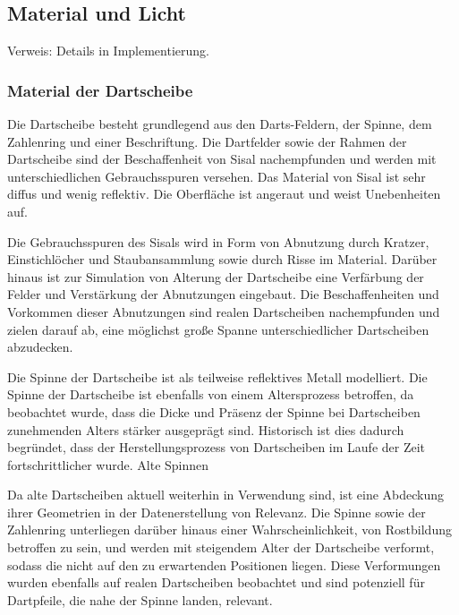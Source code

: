 
\subsection{Material und Licht}  %
\label{sec:material_licht}

Verweis: Details in Implementierung.


\subsubsection{Material der Dartscheibe}

Die Dartscheibe besteht grundlegend aus den Darts-Feldern, der Spinne, dem Zahlenring und einer Beschriftung. Die Dartfelder sowie der Rahmen der Dartscheibe sind der Beschaffenheit von Sisal nachempfunden und werden mit unterschiedlichen Gebrauchsspuren versehen. Das Material von Sisal ist sehr diffus und wenig reflektiv. Die Oberfläche ist angeraut und weist Unebenheiten auf.

Die Gebrauchsspuren des Sisals wird in Form von Abnutzung durch Kratzer, Einstichlöcher und Staubansammlung sowie durch Risse im Material. Darüber hinaus ist zur Simulation von Alterung der Dartscheibe eine Verfärbung der Felder und Verstärkung der Abnutzungen eingebaut. Die Beschaffenheiten und Vorkommen dieser Abnutzungen sind realen Dartscheiben nachempfunden und zielen darauf ab, eine möglichst große Spanne unterschiedlicher Dartscheiben abzudecken.

Die Spinne der Dartscheibe ist als teilweise reflektives Metall modelliert. Die Spinne der Dartscheibe ist ebenfalls von einem Altersprozess betroffen, da beobachtet wurde, dass die Dicke und Präsenz der Spinne bei Dartscheiben zunehmenden Alters stärker ausgeprägt sind. Historisch ist dies dadurch begründet, dass der Herstellungsprozess von Dartscheiben im Laufe der Zeit fortschrittlicher wurde. Alte Spinnen

Da alte Dartscheiben aktuell weiterhin in Verwendung sind, ist eine Abdeckung ihrer Geometrien in der Datenerstellung von Relevanz. Die Spinne sowie der Zahlenring unterliegen darüber hinaus einer Wahrscheinlichkeit, von Rostbildung betroffen zu sein, und werden mit steigendem Alter der Dartscheibe verformt, sodass die nicht auf den zu erwartenden Positionen liegen. Diese Verformungen wurden ebenfalls auf realen Dartscheiben beobachtet und sind potenziell für Dartpfeile, die nahe der Spinne landen, relevant.

